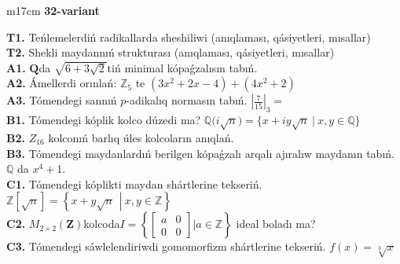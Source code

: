 \documentclass{article}
\begin{document}
\begin{tabular}{m{17cm}}
\textbf{32-variant}
\newline

\textbf{T1.} Teńlemelerdiń radikallarda sheshiliwi (anıqlaması, qásiyetleri, mısallar) \\
\textbf{T2.} Shekli maydannıń strukturası (anıqlaması, qásiyetleri, mısallar) \\
\textbf{A1.} \(\mathbf{Q}\)da \(\sqrt{6 + 3\sqrt{2}}\)tiń minimal kópaǵzalısın tabıń. \\
\textbf{A2.} Ámellerdi orınlań: \(\mathbb{Z}_{5}\) te \(\left( 3x^{2} + 2x - 4 \right) + \left( 4x^{2} + 2 \right)\) \\
\textbf{A3.} Tómendegi sannıń \(p\)-adikalıq normasın tabıń. \(|\frac{7}{15}|_{3} =\) \\
\textbf{B1.} Tómendegi kóplik kolco dúzedi ma? \(\mathbb{Q(}i\sqrt{n}) = \{ x + iy\sqrt{n}\ |\ x,y \in \mathbb{Q}\}\) \\
\textbf{B2.} \(Z_{16}\) kolconıń barlıq úles kolcoların anıqlań. \\
\textbf{B3.} Tómendegi maydanlardıń berilgen kópaǵzalı arqalı ajıralıw maydanın tabıń. \(\mathbb{Q}\) da \(x^{4} + 1\). \\
\textbf{C1.} Tómendegi kóplikti maydan shártlerine tekseriń. \(\mathbb{Z}\left\lbrack \sqrt{n} \right\rbrack = \left\{ x + y\sqrt{n}\ \ \left| \right.\ x,y \in \mathbb{Z} \right\}\) \\
\textbf{C2.} \(M_{2 \times 2}\left( \mathbf{Z} \right)\)kolcoda\(I = \left\{ \begin{bmatrix}
a & 0 \\
0 & 0
\end{bmatrix}|a\mathbb{\in Z} \right\}\) ideal boladı ma? \\
\textbf{C3.} Tómendegi sáwlelendiriwdi gomomorfizm shártlerine tekseriń. \(f(x) = \sqrt[3]{x}\) \\

\end{tabular}
\vspace{1cm}
\end{document}
